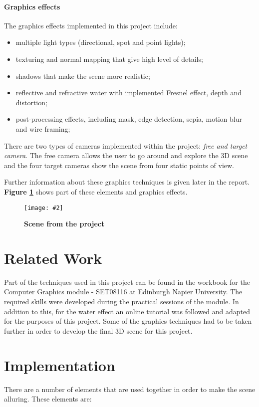 \documentclass[10pt, a4paper]{article}
\newcommand{\figuremacro}[5]{
    \begin{figure}[#1]
        \centering
        \texttt{[image: \#2]}
        \caption[#3]{\textbf{#3}#4}
        \label{fig:#2}
    \end{figure}
}
\begin{document}
    
	\paragraph{Graphics effects}The graphics effects implemented in this project include:
	\begin{itemize}
		\item multiple light types (directional, spot and point lights);
		\item texturing and normal mapping that give high level of details;
		\item shadows that make the scene more realistic;
		\item reflective and refractive water with implemented Fresnel effect, depth and distortion;
    	\item post-processing effects, including mask, edge detection, sepia, motion blur and wire framing;
	\end{itemize}
    There are two types of cameras implemented within the project: \textit{free and target camera}. The free camera allows the user to go around and explore the 3D scene and the four target cameras show the scene from four static points of view.
    
    Further information about these graphics techniques is given later in the report. \textbf{Figure {\ref{fig:general}}} shows part of these elements and graphics effects.
	\figuremacro{h}{general}{Scene from the project}{ }{1.0}
	
	\section{Related Work}

	Part of the techniques used in this project can be found in the workbook for the Computer Graphics module - SET08116 at Edinburgh Napier University\cite{book}. The required skills were developed during the practical sessions of the module. In addition to this, for the water effect an online tutorial\cite{onlineTutorial} was followed and adapted for the purposes of this project. Some of the graphics techniques had to be taken further in order to develop the final 3D scene for this project.

	\section{Implementation}
		
	There are a number of elements that are used together in order to make the scene alluring. These elements are:
\end{document}
